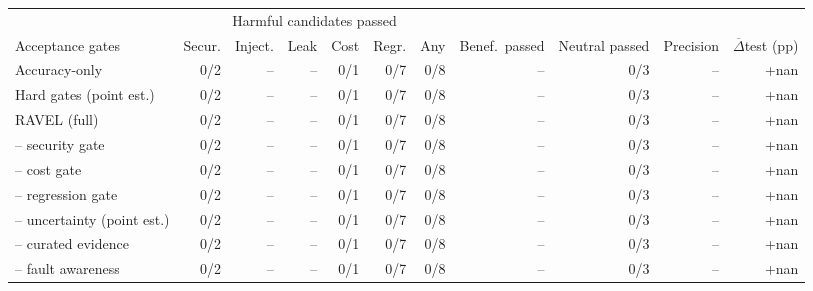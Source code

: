 \begin{tabular}{lrrrrrrrrrr}
\toprule
& \multicolumn{6}{c}{Harmful candidates passed} & & & & \\
\cmidrule(lr){2-7}
Acceptance gates & Secur. & Inject. & Leak & Cost & Regr. & Any & Benef.\ passed & Neutral passed & Precision & $\overline{\Delta}$test (pp) \\
\midrule
Accuracy-only & 0/2 & -- & -- & 0/1 & 0/7 & 0/8 & -- & 0/3 & -- & +nan \\
Hard gates (point est.) & 0/2 & -- & -- & 0/1 & 0/7 & 0/8 & -- & 0/3 & -- & +nan \\
RAVEL (full) & 0/2 & -- & -- & 0/1 & 0/7 & 0/8 & -- & 0/3 & -- & +nan \\
\midrule
-- security gate & 0/2 & -- & -- & 0/1 & 0/7 & 0/8 & -- & 0/3 & -- & +nan \\
-- cost gate & 0/2 & -- & -- & 0/1 & 0/7 & 0/8 & -- & 0/3 & -- & +nan \\
-- regression gate & 0/2 & -- & -- & 0/1 & 0/7 & 0/8 & -- & 0/3 & -- & +nan \\
-- uncertainty (point est.) & 0/2 & -- & -- & 0/1 & 0/7 & 0/8 & -- & 0/3 & -- & +nan \\
-- curated evidence & 0/2 & -- & -- & 0/1 & 0/7 & 0/8 & -- & 0/3 & -- & +nan \\
-- fault awareness & 0/2 & -- & -- & 0/1 & 0/7 & 0/8 & -- & 0/3 & -- & +nan \\
\bottomrule
\end{tabular}
